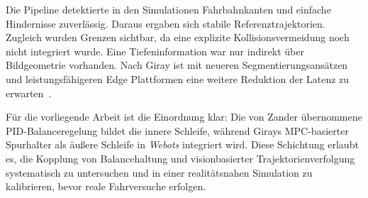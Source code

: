 Die Pipeline detektierte in den Simulationen Fahrbahnkanten und einfache Hindernisse zuverlässig. Daraus ergaben sich 
stabile Referenztrajektorien. Zugleich wurden Grenzen sichtbar, da eine explizite Kollisionsvermeidung noch nicht integriert wurde. 
Eine Tiefeninformation war nur indirekt über Bildgeometrie vorhanden. Nach Giray ist mit neueren Segmentierungsansätzen und 
leistungsfähigeren Edge Plattformen eine weitere Reduktion der Latenz zu erwarten \citep{Zhao2023}\,\citep{Ultralytics2023}.

Für die vorliegende Arbeit ist die Einordnung klar: Die von Zander übernommene 
PID-Balanceregelung bildet die innere Schleife, 
während Girays MPC-basierter Spurhalter als äußere Schleife in \emph{Webots} integriert wird. Diese Schichtung erlaubt es, die 
Kopplung von Balancehaltung und visionbasierter Trajektorienverfolgung systematisch zu untersuchen und in einer realitätsnahen 
Simulation zu kalibrieren, bevor reale Fahrversuche erfolgen.
